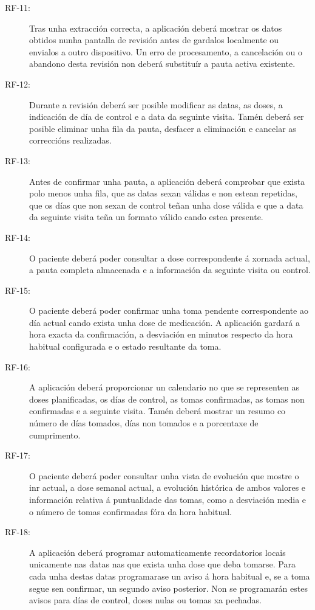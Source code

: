\begin{description}
\item[RF-11:] Tras unha extracción correcta, a aplicación deberá mostrar os datos obtidos nunha pantalla de revisión antes de gardalos localmente ou envialos a outro dispositivo. Un erro de procesamento, a cancelación ou o abandono desta revisión non deberá substituír a pauta activa existente.

\item[RF-12:] Durante a revisión deberá ser posible modificar as datas, as doses, a indicación de día de control e a data da seguinte visita. Tamén deberá ser posible eliminar unha fila da pauta, desfacer a eliminación e cancelar as correccións realizadas.

\item[RF-13:] Antes de confirmar unha pauta, a aplicación deberá comprobar que exista polo menos unha fila, que as datas sexan válidas e non estean repetidas, que os días que non sexan de control teñan unha dose válida e que a data da seguinte visita teña un formato válido cando estea presente.

\item[RF-14:] O paciente deberá poder consultar a dose correspondente á xornada actual, a pauta completa almacenada e a información da seguinte visita ou control.

\item[RF-15:] O paciente deberá poder confirmar unha toma pendente correspondente ao día actual cando exista unha dose de medicación. A aplicación gardará a hora exacta da confirmación, a desviación en minutos respecto da hora habitual configurada e o estado resultante da toma.

\item[RF-16:] A aplicación deberá proporcionar un calendario no que se representen as doses planificadas, os días de control, as tomas confirmadas, as tomas non confirmadas e a seguinte visita. Tamén deberá mostrar un resumo co número de días tomados, días non tomados e a porcentaxe de cumprimento.

\item[RF-17:] O paciente deberá poder consultar unha vista de evolución que mostre o \gls{inr} actual, a dose semanal actual, a evolución histórica de ambos valores e información relativa á puntualidade das tomas, como a desviación media e o número de tomas confirmadas fóra da hora habitual.

\item[RF-18:] A aplicación deberá programar automaticamente recordatorios locais unicamente nas datas nas que exista unha dose que deba tomarse. Para cada unha destas datas programarase un aviso á hora habitual e, se a toma segue sen confirmar, un segundo aviso posterior. Non se programarán estes avisos para días de control, doses nulas ou tomas xa pechadas.


\end{description}
